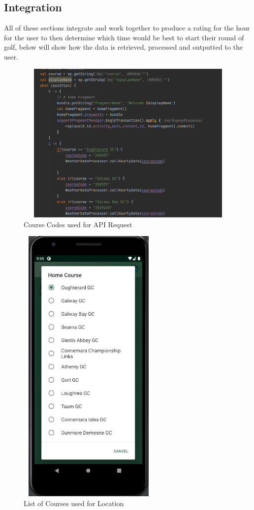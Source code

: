 \subsection{Integration}

All of these sections integrate and work together to produce a rating for the hour for the user to then determine which time would be best to start their round of golf, below will show how the data is retrieved, processed and outputted to the user.
\begin{figure}[H]
    \centering
    \includegraphics[width=12cm,height = 8cm]{img/CourseCodes.PNG}
    \caption{Course Codes used for API Request}
    \label{fig:altas config}
\end{figure}

\begin{figure}[H]
    \centering
    \includegraphics[width=7cm,height = 14cm]{img/InPhoneList.PNG}
    \caption{List of Courses used for Location}
    \label{fig:altas config}
\end{figure}

